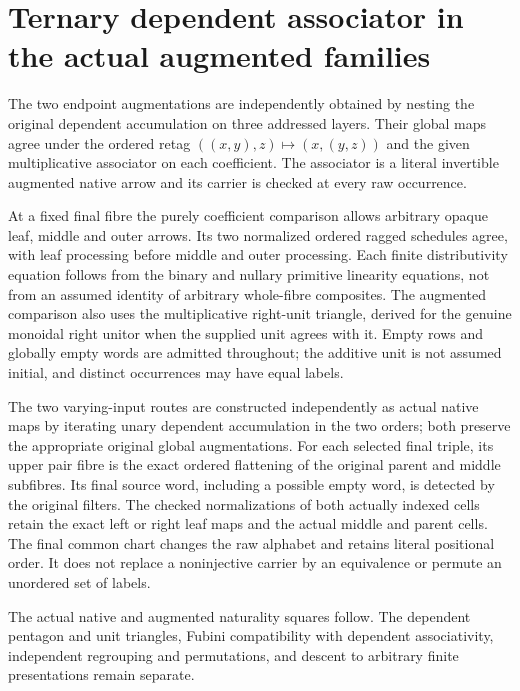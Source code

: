 \documentclass{article}
\begin{document}
\section*{Ternary dependent associator in the actual augmented families}
The two endpoint augmentations are independently obtained by
nesting the original dependent accumulation on three addressed
layers. Their global maps agree under the ordered retag
$((x,y),z)\mapsto(x,(y,z))$ and the given multiplicative
associator on each coefficient. The associator is a literal
invertible augmented native arrow and its carrier is checked
at every raw occurrence.

At a fixed final fibre the purely coefficient comparison allows
arbitrary opaque leaf, middle and outer arrows. Its two normalized
ordered ragged schedules agree, with leaf processing before middle
and outer processing. Each finite distributivity equation follows
from the binary and nullary primitive linearity equations, not from
an assumed identity of arbitrary whole-fibre composites.
The augmented comparison also uses the multiplicative right-unit
triangle, derived for the genuine monoidal right unitor when the
supplied unit agrees with it. Empty rows and globally empty
words are admitted throughout; the additive unit is not assumed
initial, and distinct occurrences may have equal labels.

The two varying-input routes are constructed independently as
actual native maps by iterating unary dependent accumulation in
the two orders; both preserve the appropriate original global
augmentations. For each selected final triple, its upper pair
fibre is the exact ordered flattening of the original parent and
middle subfibres. Its final source word, including a possible
empty word, is detected by the original filters. The checked
normalizations of both actually indexed cells retain the exact
left or right leaf maps and the actual middle and parent cells.
The final common chart changes the raw alphabet and retains
literal positional order. It does not replace a noninjective
carrier by an equivalence or permute an unordered set of labels.

The actual native and augmented naturality squares follow.
The dependent pentagon and unit triangles, Fubini compatibility
with dependent associativity, independent regrouping and permutations,
and descent to arbitrary finite presentations remain separate.
\end{document}
